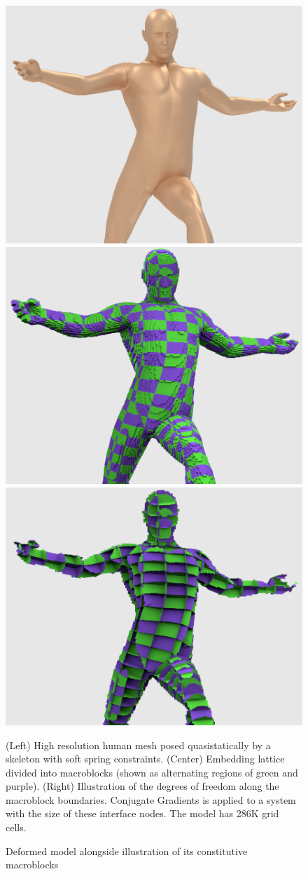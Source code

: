\begin{figure}
 \begin{center} \includegraphics[width=.32\textwidth]{chapter_macroblocks/images/skinning_skin.png} \includegraphics[width=.32\textwidth]{chapter_macroblocks/images/skinning_macroblocks.png} \includegraphics[width=.32\textwidth]{chapter_macroblocks/images/skinning_interface.png} \end{center}
 \caption{Deformed model alongside illustration of its constitutive
   macroblocks}{(Left) High resolution human mesh posed
   quasistatically by a skeleton with soft spring
   constraints. (Center) Embedding lattice divided into macroblocks
   (shown as alternating regions of green and purple). (Right)
   Illustration of the degrees of freedom along the macroblock
   boundaries. Conjugate Gradients is applied to a system with the
   size of these interface nodes. The model has 286K grid cells.}
 \label{fig:macroblocks:skinning-example}
\vspace*{-.1in}
 \end{figure} 

